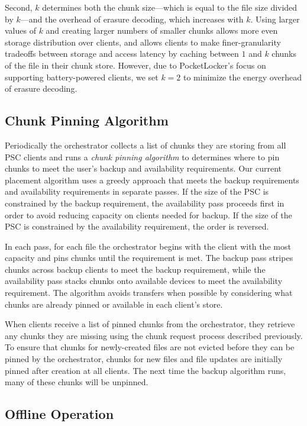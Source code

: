 Second, $k$ determines both the chunk size---which is equal to the file size
divided by $k$---and the overhead of erasure decoding, which increases with
$k$. Using larger values of $k$ and creating larger numbers of smaller chunks
allows more even storage distribution over clients, and allows clients to
make finer-granularity tradeoffs between storage and access latency by
caching between $1$ and $k$ chunks of the file in their chunk store. However,
due to PocketLocker's focus on supporting battery-powered clients, we set $k
= 2$ to minimize the energy overhead of erasure decoding.

\subsection{Chunk Pinning Algorithm}
\label{sec-design-algorithm}

Periodically the orchestrator collects a list of chunks they are storing from
all PSC clients and runs a \textit{chunk pinning algorithm} to determines
where to pin chunks to meet the user's backup and availability requirements.
Our current placement algorithm uses a greedy approach that meets the backup
requirements and availability requirements in separate passes. If the size of
the PSC is constrained by the backup requirement, the availability pass
proceeds first in order to avoid reducing capacity on clients needed for
backup. If the size of the PSC is constrained by the availability
requirement, the order is reversed.

In each pass, for each file the orchestrator begins with the client with the
most capacity and pins chunks until the requirement is met. The backup pass
stripes chunks across backup clients to meet the backup requirement, while the
availability pass stacks chunks onto available devices to meet the availability
requirement. The algorithm avoids transfers when possible by considering what
chunks are already pinned or available in each client's store.

When clients receive a list of pinned chunks from the orchestrator, they
retrieve any chunks they are missing using the chunk request process
described previously. To ensure that chunks for newly-created files are not
evicted before they can be pinned by the orchestrator, chunks for new files
and file updates are initially pinned after creation at all clients. The next
time the backup algorithm runs, many of these chunks will be unpinned.

\subsection{Offline Operation}

